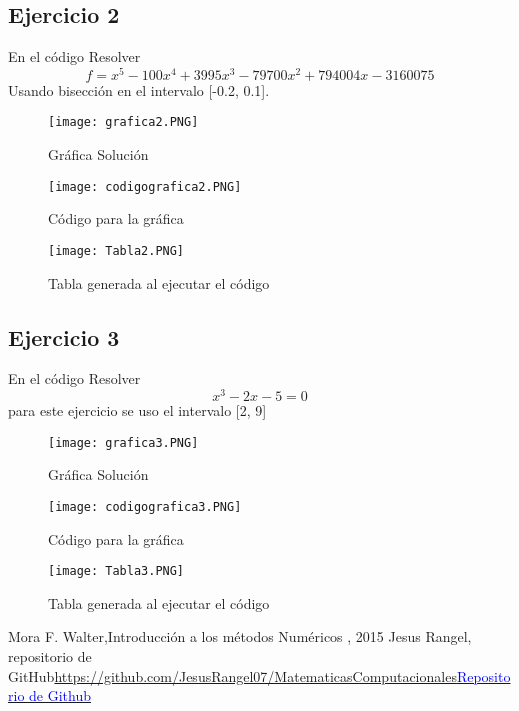 \documentclass{article}
\begin{document}
\subsection{Ejercicio 2}
En el código Resolver 
\begin{equation}
    f= x^{5}-100x^{4}+3995x^{3}-79700x^{2}+794004x-3160075
\end{equation}
Usando bisección en el intervalo [-0.2, 0.1].

\newpage

\begin{figure}[h]
    \centering
    \texttt{[image: grafica2.PNG]}
    \caption{Gráfica Solución}
    \label{fig:mesh6}
\end{figure}

\begin{figure}[h]
    \centering
    \texttt{[image: codigografica2.PNG]}
    \caption{Código para la gráfica}
    \label{fig:mesh7}
\end{figure}

\newpage

\begin{figure}[h]
    \centering
    \texttt{[image: Tabla2.PNG]}
    \caption{Tabla generada al ejecutar el código}
    \label{fig:mesh8}
\end{figure}

\subsection{Ejercicio 3}
En el código Resolver 
\begin{equation}
    x^{3}-2x-5=0
\end{equation}
para este ejercicio se uso el intervalo [2, 9]
\newpage

\begin{figure}[h]
    \centering
    \texttt{[image: grafica3.PNG]}
    \caption{Gráfica Solución}
    \label{fig:mesh9}
\end{figure}

\begin{figure}[h]
    \centering
    \texttt{[image: codigografica3.PNG]}
    \caption{Código para la gráfica}
    \label{fig:mesh10}
\end{figure}

\newpage

\begin{figure}[h]
    \centering
    \texttt{[image: Tabla3.PNG]}
    \caption{Tabla generada al ejecutar el código}
    \label{fig:mesh11}
\end{figure}

\begin{thebibliography}{0}
   Mora F. Walter,Introducción a los métodos Numéricos , 2015
  Jesus Rangel, repositorio de GitHub\textcolor{blue}{\url{https://github.com/JesusRangel07/MatematicasComputacionales}}\href{https://github.com/JesusRangel07/MatematicasComputacionales}{\textcolor{blue}{Repositorio de Github}}
\end{thebibliography}
\end{document}

